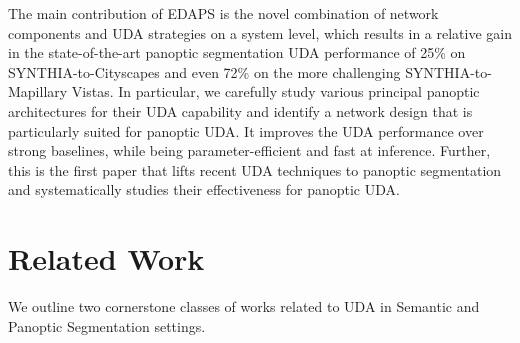\documentclass[10pt,twocolumn,letterpaper]{article}
\begin{document}
The main contribution of EDAPS is the novel combination of network components and UDA strategies on a system level, which results in a  relative gain in the state-of-the-art panoptic segmentation UDA performance of 25\% on SYNTHIA-to-Cityscapes and even 72\% on the more challenging SYNTHIA-to-Mapillary Vistas.
In particular, we carefully study various principal panoptic architectures for their UDA capability and identify a network design that is particularly suited for panoptic UDA. It improves the UDA performance over strong baselines, while being parameter-efficient and fast at inference.
Further, this is the first paper that lifts recent UDA techniques to panoptic segmentation and systematically studies their effectiveness for panoptic UDA.












 \section{Related Work}
\label{sec:relwork}
We outline two cornerstone classes of works related to UDA in Semantic and Panoptic Segmentation settings.
\end{document}
